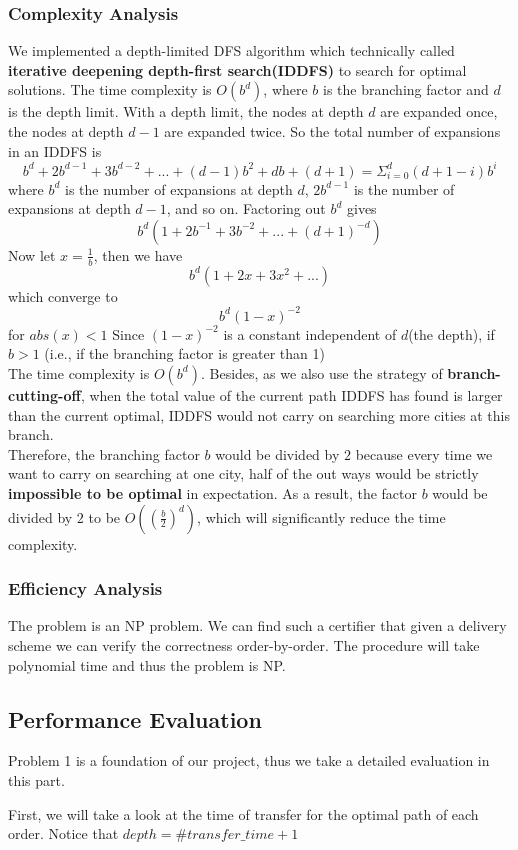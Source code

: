 \documentclass{llncs}
\begin{document}
\subsubsection{Complexity Analysis}
We implemented a depth-limited DFS algorithm which technically called \textbf{iterative deepening depth-first search(IDDFS)} to search for optimal solutions. 
The time complexity is $O(b^d)$, where $b$ is the branching factor and $d$ is the depth limit.
With a depth limit, the nodes at depth $d$ are expanded once, the nodes at depth $d-1$ are expanded twice. So the total number of expansions in an IDDFS is
$$b^d + 2b^{d-1} + 3b^{d-2} + ... + (d-1)b^2 + db + (d+1) = \Sigma_{i=0}^{d} (d + 1 - i)b^i$$
where $b^d$ is the number of expansions at depth $d$, $2b^{d-1}$ is the number of expansions at depth $d-1$, and so on. Factoring out $b^d$ gives
$$b^d(1 + 2b^{-1} + 3 b^{-2} + ... + (d + 1)^{-d})$$
Now let $x = \frac{1}{b}$, then we have 
$$b^d(1 + 2x + 3x^2 + ... )$$ which converge to 
$$b^d(1 - x)^{-2}$$ for $abs(x) < 1$
Since $(1-x)^{-2}$ is a constant independent of $d$(the depth), if $b > 1$ (i.e., if the branching factor is greater than 1)\\
The time complexity is $O(b^d)$.
Besides, as we also use the strategy of \textbf{branch-cutting-off}, when the total value of the current path IDDFS has found is larger than the current optimal, IDDFS would not carry on searching more cities at this branch.\\
Therefore, the branching factor $b$ would be divided by $2$ because every time we want to carry on searching at one city, half of the out ways would be strictly \textbf{impossible to be optimal} in expectation. As a result, the factor $b$ would be divided by $2$ to be $O((\frac{b}{2})^d)$, which will significantly reduce  the time complexity. 
\subsubsection{Efficiency Analysis}
The problem is an NP problem. We can find such a certifier that given a delivery scheme we can verify the correctness order-by-order. The procedure will take polynomial time and thus the problem is NP.
\subsection{Performance Evaluation}
Problem 1 is a foundation of our project, thus we take a detailed evaluation in this part. \par
First, we will take a look at the time of transfer for the optimal path of each order. Notice that $depth=\#transfer\_time+1$
\end{document}
